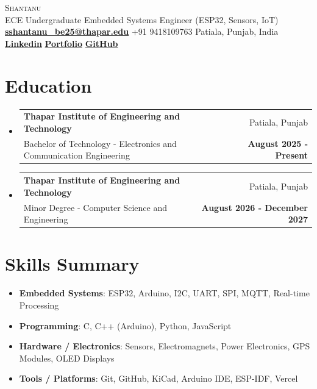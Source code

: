 \documentclass[a4paper,10pt]{article}
\makeatletter
\newcommand{\resumeItem}[2]{
  \item\normalsize{
    \textbf{#1}{: #2}
  }
}
\newcommand{\resumeSubheading}[4]{
  \vspace{-1pt}\item
    \begin{tabular*}{0.97\textwidth}{l@{\extracolsep{\fill}}r}
      \textbf{#1} & #2 \\
      #3 & \textbf{#4} \\
    \end{tabular*}\vspace{-5pt}
}
\newcommand{\resumeSubItem}[2]{\resumeItem{#1}{#2}\vspace{-3pt}}
\newcommand{\resumeSubHeadingListStart}{\begin{itemize}[leftmargin=*]}
\newcommand{\resumeSubHeadingListEnd}{\end{itemize}}
\makeatother
\begin{document}
\begin{center}
  {\Huge \scshape Shantanu} \\
  \vspace{2pt}
  \normalsize ECE Undergraduate \textbar{} Embedded Systems Engineer (ESP32, Sensors, IoT) \\
  \vspace{2pt}
  \href{mailto:sshantanu_be25@thapar.edu}{\textbf{sshantanu\_be25@thapar.edu}} \textbar{} +91 9418109763 \textbar{} Patiala, Punjab, India \\
  \vspace{2pt}
  \href{https://www.linkedin.com/in/shantanu-maratha28/}{\textbf{Linkedin}} \textbar{} \href{https://shantanu-vsc-portfolio.vercel.app}{\textbf{Portfolio}} \textbar{} \href{https://github.com/shaxntanu}{\textbf{GitHub}}
\end{center}

\section{Education}
  \resumeSubHeadingListStart
    \resumeSubheading
      {Thapar Institute of Engineering and Technology}{Patiala, Punjab}
      {Bachelor of Technology - Electronics and Communication Engineering}{August 2025 - Present}
    \resumeSubheading
      {Thapar Institute of Engineering and Technology}{Patiala, Punjab}
      {Minor Degree - Computer Science and Engineering}{August 2026 - December 2027}
    \resumeSubHeadingListEnd
	    
\vspace{-5pt}
\section{Skills Summary}
	\resumeSubHeadingListStart
	\resumeSubItem{Embedded Systems}{ESP32, Arduino, I2C, UART, SPI, MQTT, Real-time Processing}
	\resumeSubItem{Programming}{C, C++ (Arduino), Python, JavaScript}
	\resumeSubItem{Hardware / Electronics}{Sensors, Electromagnets, Power Electronics, GPS Modules, OLED Displays}
	\resumeSubItem{Tools / Platforms}{Git, GitHub, KiCad, Arduino IDE, ESP-IDF, Vercel}

\resumeSubHeadingListEnd

\vspace{-5pt}
\end{document}
